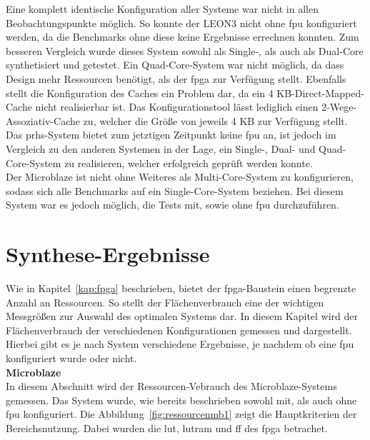 Eine komplett identische Konfiguration aller Systeme war nicht in allen Beobachtungspunkte möglich. So konnte der LEON3 nicht ohne \ac{fpu} konfiguriert werden, da die Benchmarks ohne diese
keine Ergebnisse errechnen konnten. Zum besseren Vergleich wurde dieses System sowohl als Single-, als auch als Dual-Core synthetisiert und getestet. Ein Quad-Core-System war nicht möglich,
da dass Design mehr Ressourcen benötigt, als der \ac{fpga} zur Verfügung stellt. Ebenfalls stellt die Konfiguration
des Caches ein Problem dar, da ein 4 KB-Direct-Mapped-Cache nicht realisierbar ist. Das Konfigurationstool lässt lediglich einen 2-Wege-Assoziativ-Cache zu, welcher die Größe von jeweils 4 KB
zur Verfügung stellt.\\
Das \ac{prhs}-System bietet zum jetztigen Zeitpunkt keine \ac{fpu} an, ist jedoch im Vergleich zu den anderen Systemen in der Lage, ein Single-, Dual- und Quad-Core-System zu realisieren,
 welcher erfolgreich geprüft werden konnte.\\
 Der Microblaze ist nicht ohne Weiteres als Multi-Core-System zu konfigurieren, sodass sich alle Benchmarks auf ein Single-Core-System beziehen. Bei diesem System war es jedoch möglich,
 die Tests mit, sowie ohne \ac{fpu} durchzuführen.\\



\section{Synthese-Ergebnisse}\label{kap:synthese}
Wie in Kapitel~\ref{kap:fpga} beschrieben, bietet der \ac{fpga}-Baustein einen begrenzte Anzahl an Ressourcen. So stellt der Flächenverbrauch eine der wichtigen Messgrößen zur Auswahl des
optimalen Systems dar. In diesem Kapitel wird der Flächenverbrauch der verschiedenen Konfigurationen gemessen und dargestellt. Hierbei gibt es je nach System verschiedene Ergebnisse, je nachdem
ob eine \ac{fpu} konfiguriert wurde oder nicht.\\

\textbf{Microblaze}\\

In diesem Abschnitt wird der Ressourcen-Vebrauch des Microblaze-Systems gemessen. Das System wurde, wie bereits beschrieben sowohl mit, als auch ohne \ac{fpu} konfiguriert.
Die Abbildung~\ref{fig:ressourcenmb1} zeigt die Hauptkriterien der Bereichsnutzung. Dabei wurden die \ac{lut}, \ac{lutram} und \ac{ff} des \ac{fpga} betrachet.\\

